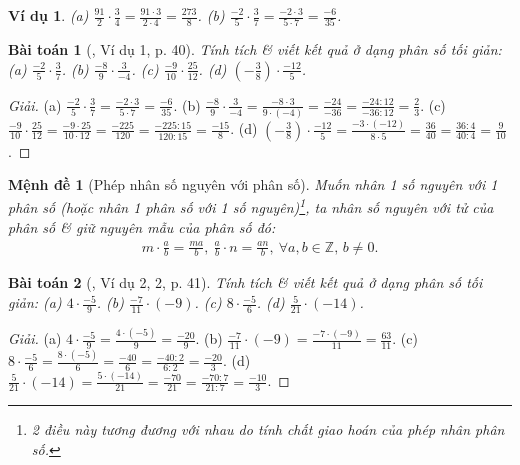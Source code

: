\documentclass{article}
\newtheorem{baitoan}{Bài toán}
\newtheorem{menhde}{Mệnh đề}
\newtheorem{vidu}{Ví dụ}
\begin{document}
\begin{vidu}
	(a) $\frac{91}{2}\cdot\frac{3}{4} = \frac{91\cdot3}{2\cdot4} = \frac{273}{8}$. (b) $\frac{-2}{5}\cdot\frac{3}{7} = \frac{-2\cdot3}{5\cdot7} = \frac{-6}{35}$.
\end{vidu}

\begin{baitoan}[\cite{SGK_Toan_6_Canh_Dieu_tap_2}, Ví dụ 1, p. 40]
	Tính tích \& viết kết quả ở dạng phân số tối giản: (a) $\frac{-2}{5}\cdot\frac{3}{7}$. (b) $\frac{-8}{9}\cdot\frac{3}{-4}$. (c) $\frac{-9}{10}\cdot\frac{25}{12}$. (d) $\left(-\frac{3}{8}\right)\cdot\frac{-12}{5}$.
\end{baitoan}

\begin{proof}[Giải]
	(a) $\frac{-2}{5}\cdot\frac{3}{7} = \frac{-2\cdot3}{5\cdot7} = \frac{-6}{35}$. (b) $\frac{-8}{9}\cdot\frac{3}{-4} = \frac{-8\cdot3}{9\cdot(-4)} = \frac{-24}{-36} = \frac{-24:12}{-36:12} = \frac{2}{3}$. (c) $\frac{-9}{10}\cdot\frac{25}{12} = \frac{-9\cdot25}{10\cdot12} = \frac{-225}{120} = \frac{-225:15}{120:15} = \frac{-15}{8}$. (d) $\left(-\frac{3}{8}\right)\cdot\frac{-12}{5} = \frac{-3\cdot(-12)}{8\cdot5} = \frac{36}{40} = \frac{36:4}{40:4} = \frac{9}{10}$.
\end{proof}

\begin{menhde}[Phép nhân số nguyên với phân số]
	Muốn nhân 1 số nguyên với 1 phân số (hoặc nhân 1 phân số với 1 số nguyên)\footnote{2 điều này tương đương với nhau do tính chất giao hoán của phép nhân phân số.}, ta nhân số nguyên với tử của phân số \& giữ nguyên mẫu của phân số đó:
	\begin{align*}
		m\cdot\frac{a}{b} = \frac{ma}{b},\ \frac{a}{b}\cdot n = \frac{an}{b},\ \forall a,b\in\mathbb{Z},\,b\ne0.
	\end{align*}
\end{menhde}

\begin{baitoan}[\cite{SGK_Toan_6_Canh_Dieu_tap_2}, Ví dụ 2, 2, p. 41]
	Tính tích \& viết kết quả ở dạng phân số tối giản: (a) $4\cdot\frac{-5}{9}$. (b) $\frac{-7}{11}\cdot(-9)$. (c) $8\cdot\frac{-5}{6}$. (d) $\frac{5}{21}\cdot(-14)$.
\end{baitoan}

\begin{proof}[Giải]
	(a) $4\cdot\frac{-5}{9} = \frac{4\cdot(-5)}{9} = \frac{-20}{9}$. (b) $\frac{-7}{11}\cdot(-9) = \frac{-7\cdot(-9)}{11} = \frac{63}{11}$. (c) $8\cdot\frac{-5}{6} = \frac{8\cdot(-5)}{6} = \frac{-40}{6} = \frac{-40:2}{6:2} = \frac{-20}{3}$. (d) $\frac{5}{21}\cdot(-14) = \frac{5\cdot(-14)}{21} = \frac{-70}{21} = \frac{-70:7}{21:7} = \frac{-10}{3}$.
\end{proof}
\end{document}
